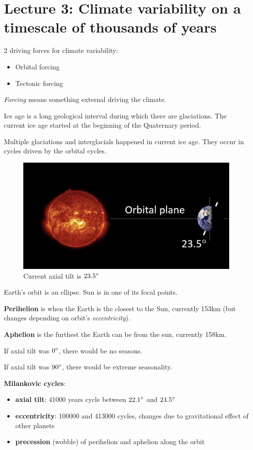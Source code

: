 \section{Lecture 3: Climate variability on a timescale of thousands of years}

2 driving forces for climate variability:
\begin{itemize}
    \item Orbital forcing
    \item Tectonic forcing
\end{itemize}

\textit{Forcing} means something external driving the climate.

Ice age is a long geological interval during which there are glaciations. The
current ice age started at the beginning of the Quaternary period.

Multiple glaciations and interglacials happened in current ice age. They occur
in cycles driven by the orbital cycles.

\begin{figure}[H]
    \centering
    \includegraphics[width=0.5\linewidth]{content/img/axial_tilt.png}
    \caption{Current axial tilt is $23.5 \degree$}
\end{figure}

Earth's orbit is an ellipse. Sun is in one of its focal points.

\textbf{Perihelion} is when the Earth is the closest to the Sun, currently
153km (but changes depending on orbit's \textit{eccentricity}).

\textbf{Aphelion} is the furthest the Earth can be from the sun, currently
158km.

If axial tilt was $0 \degree$, there would be no seasons.

If axial tilt was $90 \degree$, there would be extreme seasonality.

\textbf{Milankovic cycles}:

\begin{itemize}
    \item \textbf{axial tilt}: 41000 years cycle between $22.1 \degree$ and
    $24.5 \degree$
    \item \textbf{eccentricity}: 100000 and 413000 cycles, changes due to
    gravitational
    effect of other planets
    \item \textbf{precession} (wobble) of perihelion and aphelion along the
    orbit
\end{itemize}

